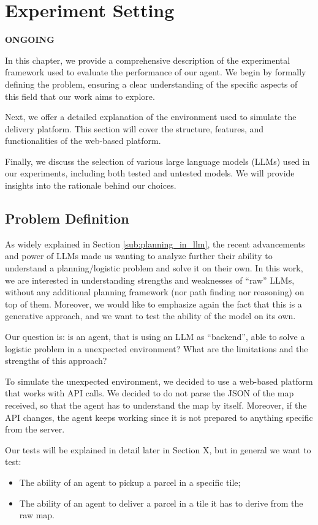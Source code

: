 \chapter{Experiment Setting}
\label{cha:experiment_setting}

\textbf{ONGOING}

In this chapter, we provide a comprehensive description of the experimental framework
used to evaluate the performance of our agent. We begin by formally defining the
problem, ensuring a clear understanding of the specific aspects of this field that
our work aims to explore.

Next, we offer a detailed explanation of the environment used to simulate the
delivery platform. This section will cover the structure, features, and functionalities
of the web-based platform.

Finally, we discuss the selection of various large language models (LLMs) used
in our experiments, including both tested and untested models. We will provide
insights into the rationale behind our choices.

\section{Problem Definition}
\label{sec:problem_definition}

As widely explained in Section \ref{sub:planning_in_llm}, the recent
advancements and power of LLMs made us wanting to analyze further their ability
to understand a planning/logistic problem and solve it on their own. In this work,
we are interested in understanding strengths and weaknesses of ``raw'' LLMs, without
any additional planning framework (nor path finding nor reasoning) on top of them.
Moreover, we would like to emphasize again the fact that this is a generative approach,
and we want to test the ability of the model on its own.

Our question is: is an agent, that is using an LLM as ``backend'', able to solve
a logistic problem in a unexpected environment? What are the limitations and the
strengths of this approach?

To simulate the unexpected environment, we decided to use a web-based platform that
works with API calls. We decided to do not parse the JSON of the map received, so
that the agent has to understand the map by itself. Moreover, if the API changes,
the agent keeps working since it is not prepared to anything specific from the
server.

Our tests will be explained in detail later in Section X, but in general we want
to test:
\begin{itemize}
  \item The ability of an agent to pickup a parcel in a specific tile;

  \item The ability of an agent to deliver a parcel in a tile it has to derive from
    the raw map.
\end{itemize}

